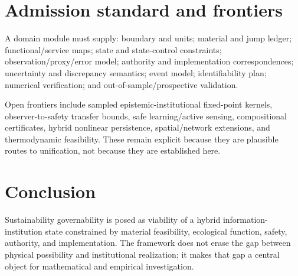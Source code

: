 \documentclass[11pt]{article}
\begin{document}
\section{Admission standard and frontiers}
A domain module must supply: boundary and units; material and jump ledger; functional/service maps; state and state-control constraints; observation/proxy/error model; authority and implementation correspondences; uncertainty and discrepancy semantics; event model; identifiability plan; numerical verification; and out-of-sample/prospective validation.

Open frontiers include sampled epistemic-institutional fixed-point kernels, observer-to-safety transfer bounds, safe learning/active sensing, compositional certificates, hybrid nonlinear persistence, spatial/network extensions, and thermodynamic feasibility. These remain explicit because they are plausible routes to unification, not because they are established here.

\section{Conclusion}
Sustainability governability is posed as viability of a hybrid information-institution state constrained by material feasibility, ecological function, safety, authority, and implementation. The framework does not erase the gap between physical possibility and institutional realization; it makes that gap a central object for mathematical and empirical investigation.
\end{document}
